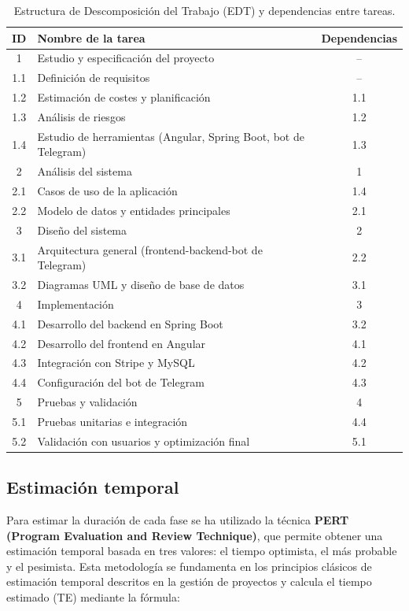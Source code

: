 \begin{table}[H]
\centering
\begin{tabular}{|c|p{9cm}|c|}
\hline
\textbf{ID} & \textbf{Nombre de la tarea} & \textbf{Dependencias} \\
\hline
1 & Estudio y especificación del proyecto & -- \\
1.1 & Definición de requisitos & -- \\
1.2 & Estimación de costes y planificación & 1.1 \\
1.3 & Análisis de riesgos & 1.2 \\
1.4 & Estudio de herramientas (Angular, Spring Boot, bot de Telegram) & 1.3 \\
2 & Análisis del sistema & 1 \\
2.1 & Casos de uso de la aplicación & 1.4 \\
2.2 & Modelo de datos y entidades principales & 2.1 \\
3 & Diseño del sistema & 2 \\
3.1 & Arquitectura general (frontend-backend-bot de Telegram) & 2.2 \\
3.2 & Diagramas UML y diseño de base de datos & 3.1 \\
4 & Implementación & 3 \\
4.1 & Desarrollo del backend en Spring Boot & 3.2 \\
4.2 & Desarrollo del frontend en Angular & 4.1 \\
4.3 & Integración con Stripe y MySQL & 4.2 \\
4.4 & Configuración del bot de Telegram & 4.3 \\
5 & Pruebas y validación & 4 \\
5.1 & Pruebas unitarias e integración & 4.4 \\
5.2 & Validación con usuarios y optimización final & 5.1 \\
\hline
\end{tabular}
\caption{Estructura de Descomposición del Trabajo (EDT) y dependencias entre tareas.}
\end{table}
\clearpage  

\subsection{Estimación temporal}

Para estimar la duración de cada fase se ha utilizado la técnica \textbf{PERT (Program Evaluation and Review Technique)}, 
que permite obtener una estimación temporal basada en tres valores: el tiempo optimista, el más probable y el pesimista. 
Esta metodología se fundamenta en los principios clásicos de estimación temporal descritos en la gestión de proyectos \cite{PMBOK2021} y 
calcula el tiempo estimado (TE) mediante la fórmula:

